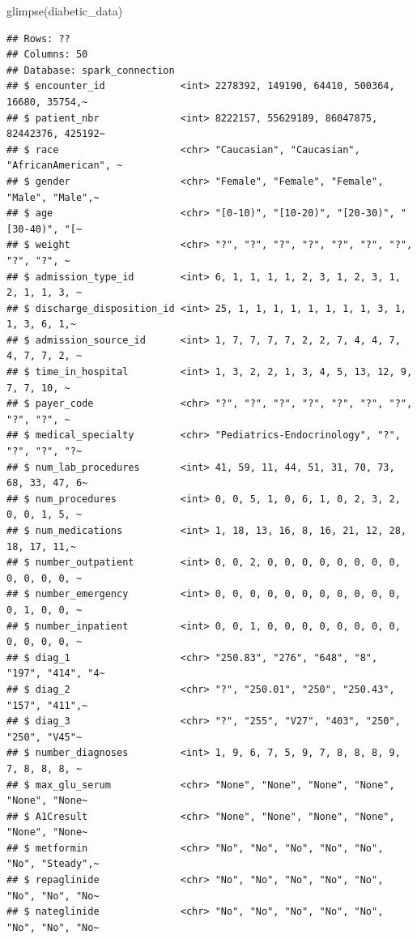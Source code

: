 \documentclass[
]{article}
\newenvironment{Shaded}{\begin{snugshade}}{\end{snugshade}}
\newcommand{\FunctionTok}[1]{\textcolor[rgb]{0.00,0.00,0.00}{#1}}
\newcommand{\NormalTok}[1]{#1}
\begin{document}
\begin{Shaded}
\begin{Highlighting}[]
\FunctionTok{glimpse}\NormalTok{(diabetic\_data)}
\end{Highlighting}
\end{Shaded}

\begin{verbatim}
## Rows: ??
## Columns: 50
## Database: spark_connection
## $ encounter_id             <int> 2278392, 149190, 64410, 500364, 16680, 35754,~
## $ patient_nbr              <int> 8222157, 55629189, 86047875, 82442376, 425192~
## $ race                     <chr> "Caucasian", "Caucasian", "AfricanAmerican", ~
## $ gender                   <chr> "Female", "Female", "Female", "Male", "Male",~
## $ age                      <chr> "[0-10)", "[10-20)", "[20-30)", "[30-40)", "[~
## $ weight                   <chr> "?", "?", "?", "?", "?", "?", "?", "?", "?", ~
## $ admission_type_id        <int> 6, 1, 1, 1, 1, 2, 3, 1, 2, 3, 1, 2, 1, 1, 3, ~
## $ discharge_disposition_id <int> 25, 1, 1, 1, 1, 1, 1, 1, 1, 3, 1, 1, 3, 6, 1,~
## $ admission_source_id      <int> 1, 7, 7, 7, 7, 2, 2, 7, 4, 4, 7, 4, 7, 7, 2, ~
## $ time_in_hospital         <int> 1, 3, 2, 2, 1, 3, 4, 5, 13, 12, 9, 7, 7, 10, ~
## $ payer_code               <chr> "?", "?", "?", "?", "?", "?", "?", "?", "?", ~
## $ medical_specialty        <chr> "Pediatrics-Endocrinology", "?", "?", "?", "?~
## $ num_lab_procedures       <int> 41, 59, 11, 44, 51, 31, 70, 73, 68, 33, 47, 6~
## $ num_procedures           <int> 0, 0, 5, 1, 0, 6, 1, 0, 2, 3, 2, 0, 0, 1, 5, ~
## $ num_medications          <int> 1, 18, 13, 16, 8, 16, 21, 12, 28, 18, 17, 11,~
## $ number_outpatient        <int> 0, 0, 2, 0, 0, 0, 0, 0, 0, 0, 0, 0, 0, 0, 0, ~
## $ number_emergency         <int> 0, 0, 0, 0, 0, 0, 0, 0, 0, 0, 0, 0, 1, 0, 0, ~
## $ number_inpatient         <int> 0, 0, 1, 0, 0, 0, 0, 0, 0, 0, 0, 0, 0, 0, 0, ~
## $ diag_1                   <chr> "250.83", "276", "648", "8", "197", "414", "4~
## $ diag_2                   <chr> "?", "250.01", "250", "250.43", "157", "411",~
## $ diag_3                   <chr> "?", "255", "V27", "403", "250", "250", "V45"~
## $ number_diagnoses         <int> 1, 9, 6, 7, 5, 9, 7, 8, 8, 8, 9, 7, 8, 8, 8, ~
## $ max_glu_serum            <chr> "None", "None", "None", "None", "None", "None~
## $ A1Cresult                <chr> "None", "None", "None", "None", "None", "None~
## $ metformin                <chr> "No", "No", "No", "No", "No", "No", "Steady",~
## $ repaglinide              <chr> "No", "No", "No", "No", "No", "No", "No", "No~
## $ nateglinide              <chr> "No", "No", "No", "No", "No", "No", "No", "No~

\end{verbatim}
\end{document}
